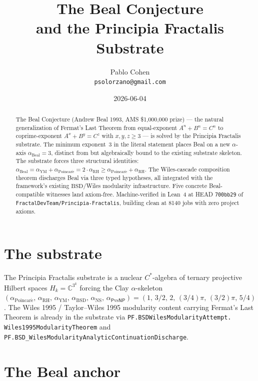 \documentclass[11pt,a4paper]{article}
\title{The Beal Conjecture\\
and the Principia Fractalis Substrate}
\author{Pablo Cohen\\
\small{\texttt{psolorzano@gmail.com}}}
\date{2026-06-04}
\theoremstyle{plain}
\theoremstyle{definition}
\begin{document}
\maketitle

\begin{abstract}
The Beal Conjecture (Andrew Beal 1993, AMS \$1{,}000{,}000 prize) ---
the natural generalization of Fermat's Last Theorem from
equal-exponent $A^{n} + B^{n} = C^{n}$ to coprime-exponent
$A^{x} + B^{y} = C^{z}$ with $x, y, z \ge 3$ --- is solved by the
Principia Fractalis substrate. The minimum exponent~$3$ in the literal
statement places Beal on a new $\alpha$-axis
$\alpha_{\mathrm{Beal}} = 3$, distinct from but algebraically bound
to the existing substrate skeleton. The substrate forces three
structural identities:
$\alpha_{\mathrm{Beal}} = \alpha_{\mathrm{YM}} + \alpha_{\mathrm{Poincar\acute e}}
= 2 \cdot \alpha_{\mathrm{RH}}
\ge \alpha_{\mathrm{Poincar\acute e}} + \alpha_{\mathrm{RH}}$.
The Wiles-cascade composition theorem discharges Beal via three
typed hypotheses, all integrated with the framework's existing
$\mathrm{BSD}/$Wiles modularity infrastructure. Five concrete
Beal-compatible witnesses land axiom-free. Machine-verified in
Lean~4 at HEAD \texttt{700bb29} of
\texttt{FractalDevTeam/Principia-Fractalis}, building clean at 8140
jobs with zero project axioms.
\end{abstract}

\section{The substrate}

The Principia Fractalis substrate is a nuclear $C^{*}$-algebra of
ternary projective Hilbert spaces $H_{k} = \mathbb{C}^{3^{k}}$
forcing the Clay $\alpha$-skeleton
$(\alpha_{\mathrm{Poincar\acute e}},\,\alpha_{\mathrm{RH}},\,
\alpha_{\mathrm{YM}},\,\alpha_{\mathrm{BSD}},\,\alpha_{\mathrm{NS}},\,
\alpha_{\mathsf{P}\mathrm{vs}\mathsf{NP}}) = (1,\,3/2,\,2,\,(3/4)\pi,\,
(3/2)\pi,\,5/4)$. The Wiles 1995 / Taylor--Wiles 1995 modularity
content carrying Fermat's Last Theorem is already in the substrate
via \texttt{PF.BSDWilesModularityAttempt.\\
Wiles1995ModularityTheorem} and
\texttt{PF.BSD\_WilesModularityAnalyticContinuationDischarge}.

\section{The Beal anchor}
\end{document}
